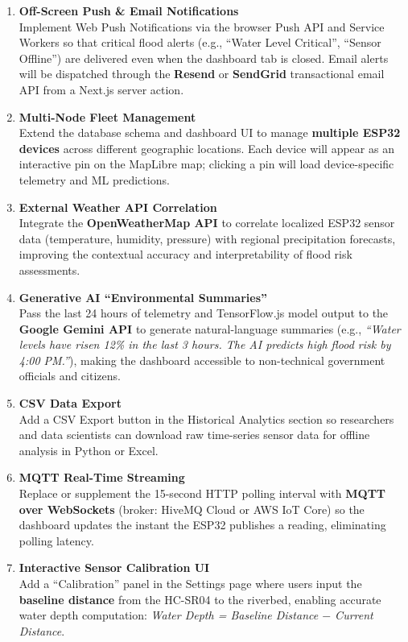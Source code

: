 \documentclass[10pt,a4paper]{article}
\begin{document}
\begin{enumerate}[leftmargin=1.8em, itemsep=5pt]

    \item \textbf{Off-Screen Push \& Email Notifications} \\
    Implement Web Push Notifications via the browser Push API and Service Workers so
    that critical flood alerts (e.g., ``Water Level Critical'', ``Sensor Offline'') are
    delivered even when the dashboard tab is closed. Email alerts will be dispatched
    through the \textbf{Resend} or \textbf{SendGrid} transactional email API from a
    Next.js server action.

    \item \textbf{Multi-Node Fleet Management} \\
    Extend the database schema and dashboard UI to manage \textbf{multiple ESP32 devices}
    across different geographic locations. Each device will appear as an interactive pin
    on the MapLibre map; clicking a pin will load device-specific telemetry and ML
    predictions.

    \item \textbf{External Weather API Correlation} \\
    Integrate the \textbf{OpenWeatherMap API} to correlate localized ESP32 sensor data
    (temperature, humidity, pressure) with regional precipitation forecasts, improving
    the contextual accuracy and interpretability of flood risk assessments.

    \item \textbf{Generative AI ``Environmental Summaries''} \\
    Pass the last 24 hours of telemetry and TensorFlow.js model output to the
    \textbf{Google Gemini API} to generate natural-language summaries (e.g.,
    \textit{``Water levels have risen 12\% in the last 3 hours. The AI predicts high
    flood risk by 4:00 PM.''}), making the dashboard accessible to non-technical
    government officials and citizens.

    \item \textbf{CSV Data Export} \\
    Add a CSV Export button in the Historical Analytics section so researchers and data
    scientists can download raw time-series sensor data for offline analysis in Python
    or Excel.

    \item \textbf{MQTT Real-Time Streaming} \\
    Replace or supplement the 15-second HTTP polling interval with \textbf{MQTT over
    WebSockets} (broker: HiveMQ Cloud or AWS IoT Core) so the dashboard updates the
    instant the ESP32 publishes a reading, eliminating polling latency.

    \item \textbf{Interactive Sensor Calibration UI} \\
    Add a ``Calibration'' panel in the Settings page where users input the
    \textbf{baseline distance} from the HC-SR04 to the riverbed, enabling accurate water
    depth computation: \textit{Water Depth = Baseline Distance $-$ Current Distance}.

\end{enumerate}
\end{document}
